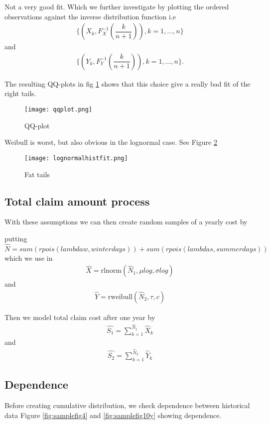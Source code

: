 \documentclass[11pt]{article}
\begin{document}
Not a very good fit. Which we further investigate by plotting  the ordered observations against the inverse distribution function  i.e
\begin{align*}
	\bigg\{ \left( X_k, F_X^{-1}\left(\dfrac{k}{n+1}\right)\right),k=1,\dots,n \bigg\}
\end{align*}
and
\begin{align*}
	\bigg\{ \left( Y_k, F_Y^{-1}\left(\dfrac{k}{n+1}\right)\right),k=1,\dots,n \bigg\}.
\end{align*}

The resulting QQ-plots in fig \ref{fig:qqplot} shows that this choice give a really bad fit of the right tails.

 \begin{figure}[h]
 \center
  \texttt{[image: qqplot.png]}
  \caption{QQ-plot}
  \label{fig:qqplot}
\end{figure}

Weibull is worst, but also obvious in the lognormal case. See Figure \ref{fig:fit}
 \begin{figure}[H]
 \center
  \texttt{[image: lognormalhistfit.png]}
  \caption{Fat tails}
  \label{fig:fit}
\end{figure}

\subsection*{Total claim amount process}
With these assumptions we can then
 create random samples of a yearly cost by

putting $\hat{N} =  sum(rpois(lambdaw,winterdays)) +  sum(rpois(lambdas,summerdays))$
which we use in
\begin{align*} 
	\hat{X} = \mathrm{rlnorm}(\hat{N}_1,\mu log,\sigma log) 
\end{align*}
and
\begin{align*} 
	 \hat{Y} =\mathrm{ rweibull}(\hat{N}_2,\tau,c)
\end{align*}

Then we model total claim cost after one year by
\begin{align} \label{eq:sum12}
	\hat{S_1} = \sum_{k=1}^{\hat{N}_1} \hat{ X}_k   
\end{align}
and
\begin{align} \label{eq:sum22}
	 \hat{S_2} = \sum_{k=1}^{\hat{N}_2} \hat{Y}_k
\end{align}


\subsection*{Dependence}
Before creating cumulative distribution, we check dependence between historical data
 Figure \ref{fig:samplefig4} and  \ref{fig:samplefig10y} showing dependence.
\end{document}
